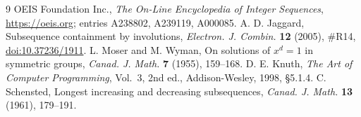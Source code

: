 \documentclass[11pt,a4paper]{article}
\theoremstyle{remark}
\begin{document}
\begin{thebibliography}{9}
 OEIS Foundation Inc., \emph{The On-Line Encyclopedia of Integer Sequences}, \url{https://oeis.org}; entries A238802, A239119, A000085.
 A. D. Jaggard, Subsequence containment by involutions, \emph{Electron. J. Combin.} \textbf{12} (2005), \#R14, \href{https://doi.org/10.37236/1911}{doi:10.37236/1911}.
 L. Moser and M. Wyman, On solutions of $x^d=1$ in symmetric groups, \emph{Canad. J. Math.} \textbf{7} (1955), 159--168.
 D. E. Knuth, \emph{The Art of Computer Programming}, Vol.~3, 2nd ed., Addison-Wesley, 1998, \S5.1.4.
 C. Schensted, Longest increasing and decreasing subsequences, \emph{Canad. J. Math.} \textbf{13} (1961), 179--191.
\end{thebibliography}
\end{document}
